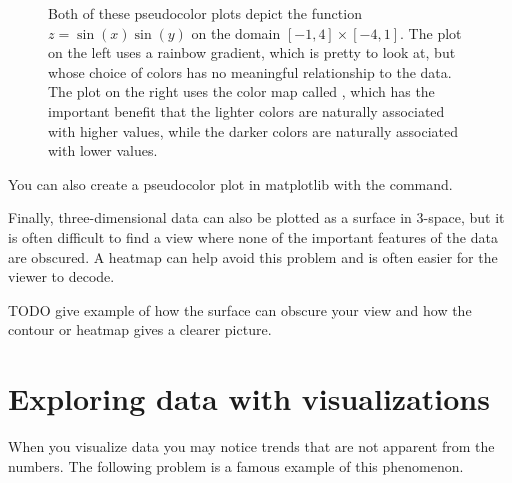 \begin{figure}
\begin{subfigure}{.5\textwidth}
\end{subfigure}
\caption{Both of these pseudocolor plots depict the function $z = \sin(x)\sin(y)$ on the domain $[-1,4] \times [-4,1]$. 
The plot on the left uses a rainbow gradient, which is pretty to look at, but whose choice of colors has no meaningful relationship to the data. 
The plot on the right uses the color map called , which has the important benefit that the lighter colors are naturally associated with higher values, while the darker colors are naturally associated with lower values.}
\label{fig:heatmap}
\end{figure}



You can also create a pseudocolor plot in matplotlib with the  command.

Finally, three-dimensional data can also be plotted as a surface in 3-space, but it is often difficult to find a view where none of the important features of the data are obscured.
A heatmap can help avoid this problem and is often easier for the viewer to decode.


TODO give example of how the surface can obscure your view and how the contour or heatmap gives a clearer picture.


\section*{Exploring data with visualizations}
When you visualize data you may notice trends that are not apparent from the numbers. 
The following problem is a famous example of this phenomenon.

